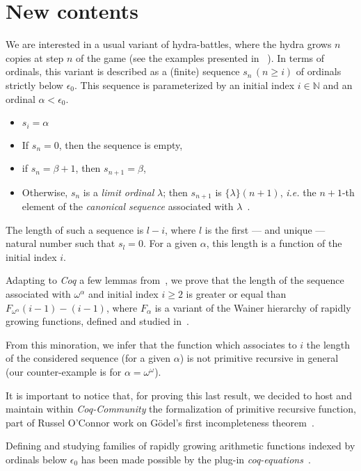 \documentclass{easychair}
\newcommand{\canonseq}[2]{\mbox{$\{#1\}(#2)$}}
\begin{document}
\section{New contents}
We are interested in a usual variant of hydra-battles, where the hydra grows $n$ copies at step $n$ of the game (see the examples presented in ~\cite{KP82, BauerHydra}).
In terms of ordinals, this variant is described as a (finite) sequence $s_n\,(n\geq i)$ of ordinals strictly below $\epsilon_0$.
This sequence is parameterized by an initial index $i\in\mathbb{N}$ and an ordinal $\alpha<\epsilon_0$.

\begin{itemize}
  \item $s_i=\alpha$
\item If $s_n=0$, then the sequence is empty,
\item if $s_n=\beta+1$, then $s_{n+1}=\beta$,
\item Otherwise, $s_n$ is a \emph{limit ordinal} $\lambda$; then $s_{n+1}$ is $\canonseq{\lambda}{n+1}$, \emph{i.e.} the
    $n+1$-th element of the \emph{canonical sequence} associated with $\lambda$~\cite{KS81}.
\end{itemize} 

The length of such a sequence is $l-i$, where $l$ is the first --- and unique --- natural number such that $s_l=0$.
For a given $\alpha$, this length is a function of 
the initial index $i$.

Adapting to \emph{Coq} a few lemmas from~\cite{KS81}, we prove that the length  of the sequence associated with
$\omega^\alpha$ and initial index $i\geq 2$ is greater or equal than
$F_{\omega^\alpha}(i-1)-(i-1)$, where $F_\alpha$ is a variant of the Wainer hierarchy of rapidly growing functions, defined and studied in~\cite{KS81}.

From this minoration, we infer that the function which associates to $i$ the length of the considered sequence (for a given $\alpha$) is not primitive recursive in general (our counter-example is for $\alpha=\omega^\omega$).

It is important to notice that, for proving this last result, we decided to host and maintain within \emph{Coq-Community} the formalization of primitive recursive function, part of Russel O'Connor work on G\"{o}del's first incompleteness theorem~\cite{OConnor05}.

Defining and studying families of rapidly growing arithmetic  functions indexed by ordinals below $\epsilon_0$ has been made possible by the plug-in \emph{coq-equations}~\cite{sozeau:hal-01671777}.
\end{document}
